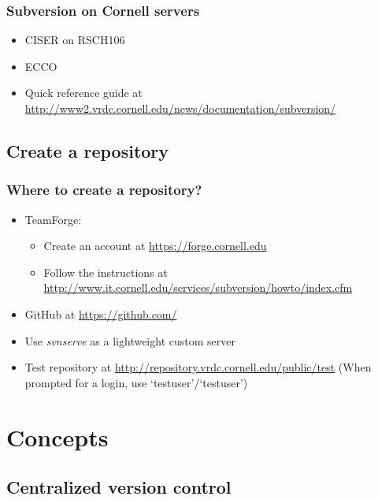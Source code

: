 \documentclass{beamer}
\begin{document}
\frame
{
  \frametitle{Subversion on Cornell servers}
  
  \begin{itemize}
  \item<1-> CISER on RSCH106
  \item<2-> ECCO
  \item<3-> Quick reference guide at \url{http://www2.vrdc.cornell.edu/news/documentation/subversion/}
  \end{itemize}

}

\subsection{Create a repository}

\frame
{
  \frametitle{Where to create a repository?}
  
  \begin{itemize}
  \item<1-> TeamForge:
  	\begin{itemize}
	\item<1-> Create an account at \url{https://forge.cornell.edu}
	\item<1-> Follow the instructions at \url{http://www.it.cornell.edu/services/subversion/howto/index.cfm}
	\end{itemize}
  \item<2-> GitHub at \url{https://github.com/}
  \item<3-> Use \textit{svnserve} as a lightweight custom server
  \item<4-> Test repository at \url{http://repository.vrdc.cornell.edu/public/test} (When prompted for a login, use `testuser'/`testuser')
  \end{itemize}

}


\section{Concepts}
\frame{\tableofcontents[currentsection]}

\subsection{Centralized version control}
\end{document}
